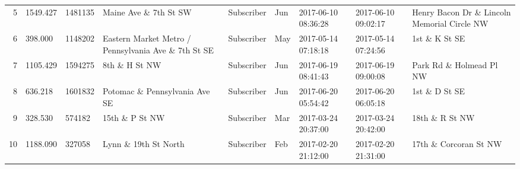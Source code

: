 \documentclass[11pt]{article}
\begin{document}
\begin{tabular}{r|llllllll}
	5 & 1549.427                                                & 1481135                                                 & Maine Ave \& 7th St SW                                 & Subscriber                                              & Jun                                                     & 2017-06-10 08:36:28                                     & 2017-06-10 09:02:17                                     & Henry Bacon Dr \& Lincoln Memorial Circle NW          \\
	6 &  398.000                                                & 1148202                                                 & Eastern Market Metro / Pennsylvania Ave \& 7th St SE   & Subscriber                                              & May                                                     & 2017-05-14 07:18:18                                     & 2017-05-14 07:24:56                                     & 1st \& K St SE                                        \\
	7 & 1105.429                                                & 1594275                                                 & 8th \& H St NW                                         & Subscriber                                              & Jun                                                     & 2017-06-19 08:41:43                                     & 2017-06-19 09:00:08                                     & Park Rd \& Holmead Pl NW                              \\
	8 &  636.218                                                & 1601832                                                 & Potomac \& Pennsylvania Ave SE                         & Subscriber                                              & Jun                                                     & 2017-06-20 05:54:42                                     & 2017-06-20 06:05:18                                     & 1st \& D St SE                                        \\
	9 &  328.530                                                &  574182                                                 & 15th \& P St NW                                        & Subscriber                                              & Mar                                                     & 2017-03-24 20:37:00                                     & 2017-03-24 20:42:00                                     & 18th \& R St NW                                       \\
	10 & 1188.090                                                &  327058                                                 & Lynn \& 19th St North                                  & Subscriber                                              & Feb                                                     & 2017-02-20 21:12:00                                     & 2017-02-20 21:31:00                                     & 17th \& Corcoran St NW                                \\

\end{tabular}
\end{document}
